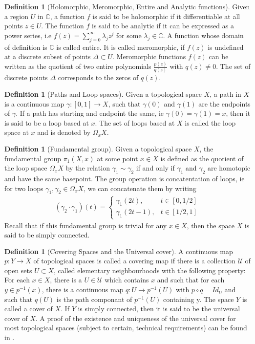 \documentclass[11pt]{report}
\theoremstyle{definition}
\newtheorem{defn}[thm]{Definition}
\begin{document}
\begin{defn}[Holomorphic, Meromorphic, Entire and Analytic functions]
  Given a region $U$ in $\mathbb{C}$, a function $f$ is said to be holomorphic if it differentiable at all points $z \in U$. The function $f$ is said to be analytic if it can be expressed as a power series, i.e $f(z) = \sum\limits^{\infty}_{j=0}\lambda_jz^j$ for some $\lambda_j \in \mathbb{C}$. A function whose domain of definition is $\mathbb{C}$ is called entire. It is called meromorphic, if $f(z)$ is undefined at a discrete subset of points $\Delta \subset U$. Meromorphic functions $f(z)$ can be written as the quotient of two entire polynomials $\frac{p(z)}{q(z)}$ with $q(z) \neq 0$. The set of discrete points $\Delta$ corresponds to the zeros of $q(z)$.
\end{defn}
\begin{defn}[Paths and Loop spaces]
  Given a topological space $X$, a path in $X$ is a continuous map $\gamma \colon [0,1] \rightarrow X$, such that $\gamma(0)$ and $\gamma(1)$ are the endpoints of $\gamma$. If a path has starting and endpoint the same, ie $\gamma(0)=\gamma(1) = x$, then it is said to be a loop based at $x$. The set of loops based at $X$ is called the loop space at $x$ and is denoted by $\Omega_xX$.
\end{defn}
\begin{defn}[Fundamental group]
  Given a topological space $X$, the fundamental group $\pi_1(X,x)$ at some point $x \in X$ is defined as the quotient of the loop space $\Omega_xX$ by the relation $\gamma_1 \sim\gamma_2$ if and only if $\gamma_1$ and $\gamma_2$ are homotopic and have the same basepoint. The group operation is concatentation of loops, ie for two loops $\gamma_1,\gamma_2 \in \Omega_xX$, we can concatenate them by writing 
  \begin{align*}
    (\gamma_2\cdot\gamma_1)(t) = \begin{cases}
      \gamma_1(2t), &t \in [0,1/2] \\
      \gamma_1(2t-1), &t \in [1/2,1]
    \end{cases}
  \end{align*}
  Recall that if this fundamental group is trivial for any $x \in X$, then the space $X$ is said to be simply connected.
\end{defn}
\begin{defn}[Covering Spaces and the Universal cover]
  A continuous map $p\colon Y \rightarrow X$ of topological spaces is called a covering map if there is a collection $\mathcal{U}$ of open sets $U \subset X$, called elementary neighbourhoods with the following property: For each $x \in X$, there is a $U\in \mathcal{U}$ which contains $x$ and such that for each $y \in p^{-1}(x)$, there is a continuous map $q:U \rightarrow p^{-1}(U)$ with $p\circ q = Id_U$ and such that $q(U)$ is the path componant of $p^{-1}(U)$ containing y. The space $Y$ is called a cover of $X$. If $Y$ is simply connected, then it is said to be the universal cover of $X$.  A proof of the existence and uniqueness of the universal cover for most topological spaces (subject to certain, technical requirements) can be found in \cite[p.63]{Hatchers}.
\end{defn}
\end{document}
